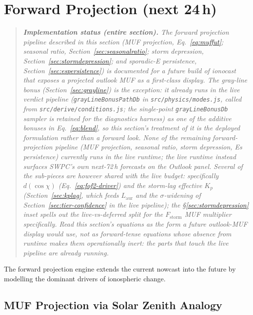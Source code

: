 \documentclass[11pt,a4paper]{article}
\begin{document}
\section{Forward Projection (next 24\,h)}\label{sec:projection}

\begin{quote}\small\itshape
\textbf{Implementation status (entire section).}  The forward
projection pipeline described in this section (MUF projection,
Eq.~\ref{eq:muffut}; seasonal ratio,
Section~\ref{sec:seasonalratio}; storm depression,
Section~\ref{sec:stormdepression}; and sporadic-E persistence,
Section~\ref{sec:espersistence}) is documented for a future
build of ionocast that exposes a projected outlook MUF as a
first-class display.  The gray-line bonus
(Section~\ref{sec:grayline}) is the exception: it already runs in
the live verdict pipeline (\texttt{grayLineBonusPathDb} in
\texttt{src/physics/modes.js}, called from
\texttt{src/derive/conditions.js}; the single-point
\texttt{grayLineBonusDb} sampler is retained for the diagnostics
harness) as one of the additive bonuses
in Eq.~\ref{eq:blend}, so this section's treatment of it is the
\emph{deployed} formulation rather than a forward look.
None of the \emph{remaining} forward-projection pipeline (MUF
projection, seasonal ratio, storm depression, Es persistence)
currently runs in the live runtime; the live runtime instead
surfaces SWPC's own next-72\,h forecasts on the Outlook panel.
Several of the sub-pieces are however shared with the live
budget: specifically
$d(\cos\chi)$ (Eq.~\ref{eq:fof2-driver}) and the storm-lag
effective $K_p$ (Section~\ref{sec:kplag}, which feeds
$L_{\text{aur}}$ and the $\sigma$-widening of
Section~\ref{sec:tier-confidence} in the \emph{live} pipeline);
the §\ref{sec:stormdepression} inset spells out the live-vs-deferred
split for the $F_{\text{storm}}$ MUF multiplier specifically.
Read this section's equations as the form a future outlook-MUF
display would use, not as forward-tense equations whose absence
from runtime makes them operationally inert: the parts that
touch the live pipeline are already running.
\end{quote}

The forward projection engine extends the current nowcast into the
future by modelling the dominant drivers of ionospheric change.

\subsection{MUF Projection via Solar Zenith Analogy}\label{sec:muf-now-vs-future}
\end{document}
